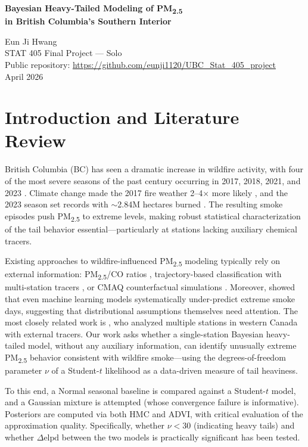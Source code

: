 \documentclass[10pt]{article}
\renewcommand{\maketitle}{\bgroup\setlength{\parindent}{0pt}
\begin{center}
  {\normalsize\bfseries Bayesian Heavy-Tailed Modeling of PM\textsubscript{2.5}\\[2pt]
   in British Columbia's Southern Interior\par}
  \vspace{5pt}
  {\small Eun Ji Hwang\\[1pt]}
  {\footnotesize STAT 405 Final Project --- Solo\\[1pt]
   Public repository: \url{https://github.com/eunji1120/UBC_Stat_405_project}\\[1pt]
   April 2026}
\end{center}\egroup\vspace{-0.5em}}
\begin{document}
\maketitle



\section{Introduction and Literature Review}

British Columbia (BC) has seen a dramatic increase in wildfire activity, with four of the most severe seasons of the past century occurring in 2017, 2018, 2021, and 2023 \citep{collins2025, daniels2024}. Climate change made the 2017 fire weather 2--4$\times$ more likely \citep{kirchmeier2018}, and the 2023 season set records with ${\sim}$2.84M hectares burned \citep{daniels2024}. The resulting smoke episodes push PM\textsubscript{2.5} to extreme levels, making robust statistical characterization of the tail behavior essential---particularly at stations lacking auxiliary chemical tracers.

Existing approaches to wildfire-influenced PM\textsubscript{2.5} modeling typically rely on external information: PM\textsubscript{2.5}/CO ratios \citep{jaffe2022}, trajectory-based classification with multi-station tracers \citep{schneider2021}, or CMAQ counterfactual simulations \citep{larsen2022}. Moreover, \citet{reid2021} showed that even machine learning models systematically under-predict extreme smoke days, suggesting that distributional assumptions themselves need attention. The most closely related work is \citet{schneider2021}, who analyzed multiple stations in western Canada with external tracers. Our work asks whether a single-station Bayesian heavy-tailed model, without any auxiliary information, can identify unusually extreme PM\textsubscript{2.5} behavior consistent with wildfire smoke---using the degrees-of-freedom parameter $\nu$ of a Student-$t$ likelihood as a data-driven measure of tail heaviness.

To this end, a Normal seasonal baseline is compared against a Student-$t$ model, and a Gaussian mixture is attempted (whose convergence failure is informative). Posteriors are computed via both HMC and ADVI, with critical evaluation of the approximation quality. Specifically, whether $\nu < 30$ (indicating heavy tails) and whether $\Delta\text{elpd}$ between the two models is practically significant has been tested.
\end{document}
